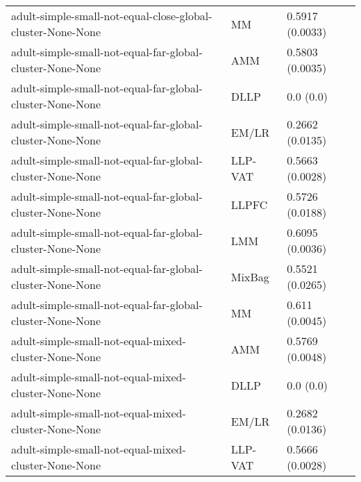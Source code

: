 \begin{longtable}{lll}
                                                  adult-simple-small-not-equal-close-global-cluster-None-None &        MM &                           0.5917 (0.0033) \\
                                                    adult-simple-small-not-equal-far-global-cluster-None-None &       AMM &                           0.5803 (0.0035) \\
                                                    adult-simple-small-not-equal-far-global-cluster-None-None &      DLLP &                                 0.0 (0.0) \\
                                                    adult-simple-small-not-equal-far-global-cluster-None-None &     EM/LR &                           0.2662 (0.0135) \\
                                                    adult-simple-small-not-equal-far-global-cluster-None-None &   LLP-VAT &                           0.5663 (0.0028) \\
                                                    adult-simple-small-not-equal-far-global-cluster-None-None &     LLPFC &                           0.5726 (0.0188) \\
                                                    adult-simple-small-not-equal-far-global-cluster-None-None &       LMM &                           0.6095 (0.0036) \\
                                                    adult-simple-small-not-equal-far-global-cluster-None-None &    MixBag &                           0.5521 (0.0265) \\
                                                    adult-simple-small-not-equal-far-global-cluster-None-None &        MM &                            0.611 (0.0045) \\
                                                         adult-simple-small-not-equal-mixed-cluster-None-None &       AMM &                           0.5769 (0.0048) \\
                                                         adult-simple-small-not-equal-mixed-cluster-None-None &      DLLP &                                 0.0 (0.0) \\
                                                         adult-simple-small-not-equal-mixed-cluster-None-None &     EM/LR &                           0.2682 (0.0136) \\
                                                         adult-simple-small-not-equal-mixed-cluster-None-None &   LLP-VAT &                           0.5666 (0.0028) \\

\end{longtable}
